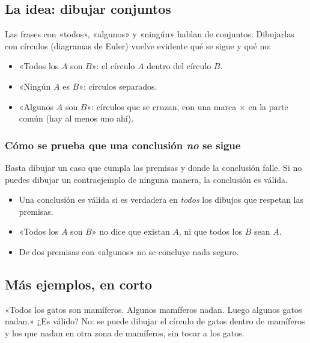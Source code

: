 \bitacora


\subsection{La idea: dibujar conjuntos}
Las frases con «todos», «algunos» y «ningún» hablan de conjuntos. Dibujarlas con círculos (diagramas de Euler) vuelve
evidente qué se sigue y qué no:
\begin{itemize}
  \item «Todos los $A$ son $B$»: el círculo $A$ dentro del círculo $B$.
  \item «Ningún $A$ es $B$»: círculos separados.
  \item «Algunos $A$ son $B$»: círculos que se cruzan, con una marca $\times$ en la parte común (hay al menos uno ahí).
\end{itemize}


\subsubsection{Cómo se prueba que una conclusión \emph{no} se sigue}
Basta dibujar un caso que cumpla las premisas y donde la conclusión falle. Si no puedes dibujar un contraejemplo de
ninguna manera, la conclusión es válida.

\begin{regla}
\begin{itemize}
  \item Una conclusión es válida si es verdadera en \emph{todos} los dibujos que respetan las premisas.
  \item «Todos los $A$ son $B$» no dice que existan $A$, ni que todos los $B$ sean $A$.
  \item De dos premisas con «algunos» no se concluye nada seguro.
\end{itemize}
\end{regla}

\subsection{Más ejemplos, en corto}
\begin{ejemplo}
«Todos los gatos son mamíferos. Algunos mamíferos nadan. Luego algunos gatos nadan.» ¿Es válido?
\solucion No: se puede dibujar el círculo de gatos dentro de mamíferos y los que nadan en otra zona de mamíferos, sin
tocar a los gatos.
\end{ejemplo}

